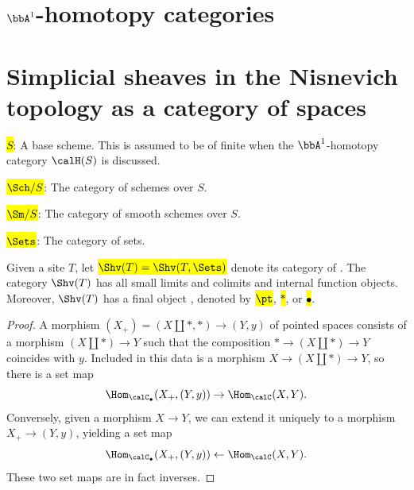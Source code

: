 
\section{\texorpdfstring{$\bbA^1$}{A1}-homotopy categories}

\section{Simplicial sheaves in the Nisnevich topology as a category of spaces}


\hl{$S$}: A base scheme. This is assumed to be  of finite  when the $\bbA^1$-homotopy category $\calH(S)$ is discussed.

\hl{$\Sch/S$}: The category of schemes over $S$.

\hl{$\Sm/S$}: The category of smooth schemes over $S$.  

\hl{$\Sets$}: The category of sets.

\begin{notation} \label{notation:sheaves_of_sets_on_a_site}
Given a site $T$, let \hl{$\Shv(T) = \Shv(T, \Sets)$} denote its category of . The category $\Shv(T)$ has all small limits and colimits and internal function objects. Moreover, $\Shv(T)$ has a final object , denoted by \hl{$\pt$}, \hl{$*$}, or \hl{$\bullet$}. 
\end{notation}








\begin{proof}
    A morphism $(X_+) = (X \coprod *, *) \to (Y,y)$ of pointed spaces consists of a morphism $\left( X \coprod * \right) \to Y$ such that the composition $* \to \left(X \coprod * \right) \to Y$ coincides with $y$. Included in this data is a morphism $X \to \left( X \coprod * \right) \to Y$, so there is a set map 
    $$\Hom_{\calC_\bullet}(X_+, (Y, y)) \to \Hom_{\calC}(X, Y).$$
    Conversely, given a morphism $X \to Y$, we can extend it uniquely to a morphism $X_+ \to (Y,y)$, yielding a set map
    $$\Hom_{\calC_\bullet}(X_+, (Y, y)) \leftarrow \Hom_{\calC}(X, Y).$$
    These two set maps are in fact inverses.
\end{proof}



